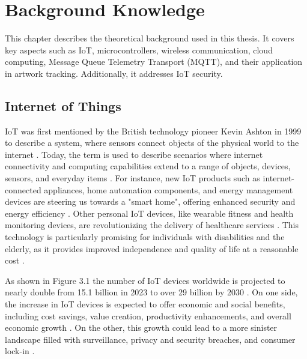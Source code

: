 \chapter{Background Knowledge}
This chapter describes the theoretical background used in this thesis. It covers key aspects such as IoT, microcontrollers, wireless communication, cloud computing, Message Queue Telemetry Transport (MQTT), and their application in artwork tracking. Additionally, it addresses IoT security.

\section{Internet of Things}
IoT was first mentioned by the British technology pioneer Kevin Ashton in 1999 to describe a system, where sensors connect objects of the physical world to the internet \cite{Rose2015}. Today, the term is used to describe scenarios where internet connectivity and computing capabilities extend to a range of objects, devices, sensors, and everyday items \cite{Rose2015}. For instance, new IoT products such as internet-connected appliances, home automation components, and energy management devices are steering us towards a "smart home", offering enhanced security and energy efficiency \cite{Rose2015}. Other personal IoT devices, like wearable fitness and health monitoring devices, are revolutionizing the delivery of healthcare services \cite{Rose2015}. This technology is particularly promising for individuals with disabilities and the elderly, as it provides improved independence and quality of life at a reasonable cost \cite{Rose2015}. 

As shown in Figure 3.1 the number of IoT devices worldwide is projected to nearly double from 15.1 billion in 2023 to over 29 billion by 2030 \cite{Vailshery2023}. On one side, the increase in IoT devices is expected to offer economic and social benefits, including cost savings, value creation, productivity enhancements, and overall economic growth \cite{Castillo2015}. On the other, this growth could lead to a more sinister landscape filled with surveillance, privacy and security breaches, and consumer lock-in \cite{Rose2015}.

